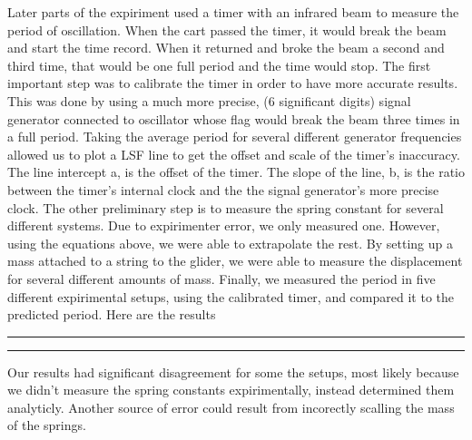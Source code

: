 \documentclass[11pt]{article}
\newcommand{\question}[2] {\vspace{.25in} \hrule\vspace{0.5em}
\noindent{\bf #1: #2} \vspace{0.5em}
\hrule \vspace{.10in}}
\begin{document}
Later parts of the expiriment used a timer with an infrared beam to measure the period of oscillation. When the cart passed the timer, it would break the beam and start the time record. When it returned and broke the beam a second and third time, that would be one full period and the time would stop.
The first important step was to calibrate the timer in order to have more accurate results. This was done by using a much more precise, (6 significant digits) signal generator connected to oscillator whose flag would break the beam three times in a full period. Taking the average period for several different generator frequencies allowed us to plot a LSF line to get the offset and scale of the timer's inaccuracy.
\vfill
The line intercept a, is the offset of the timer.
The slope of the line, b, is the ratio between the timer's internal clock and the the signal generator's more precise clock.
\newpage
The other preliminary step is to measure the spring constant for several different systems. Due to expirimenter error, we only measured one. However, using the equations above, we were able to extrapolate the rest.
By setting up a mass attached to a string to the glider, we were able to measure the displacement for several different amounts of mass.
\newpage
Finally, we measured the period in five different expirimental setups, using the calibrated timer, and compared it to the predicted period.
\vfill
Here are the results
\vfill
\question{4}{Conclusion}
Our results had significant disagreement for some the setups, most likely because we didn't measure the spring constants expirimentally, instead determined them analyticly. Another source of error could result from incorectly scalling the mass of the springs. 
\end{document}

